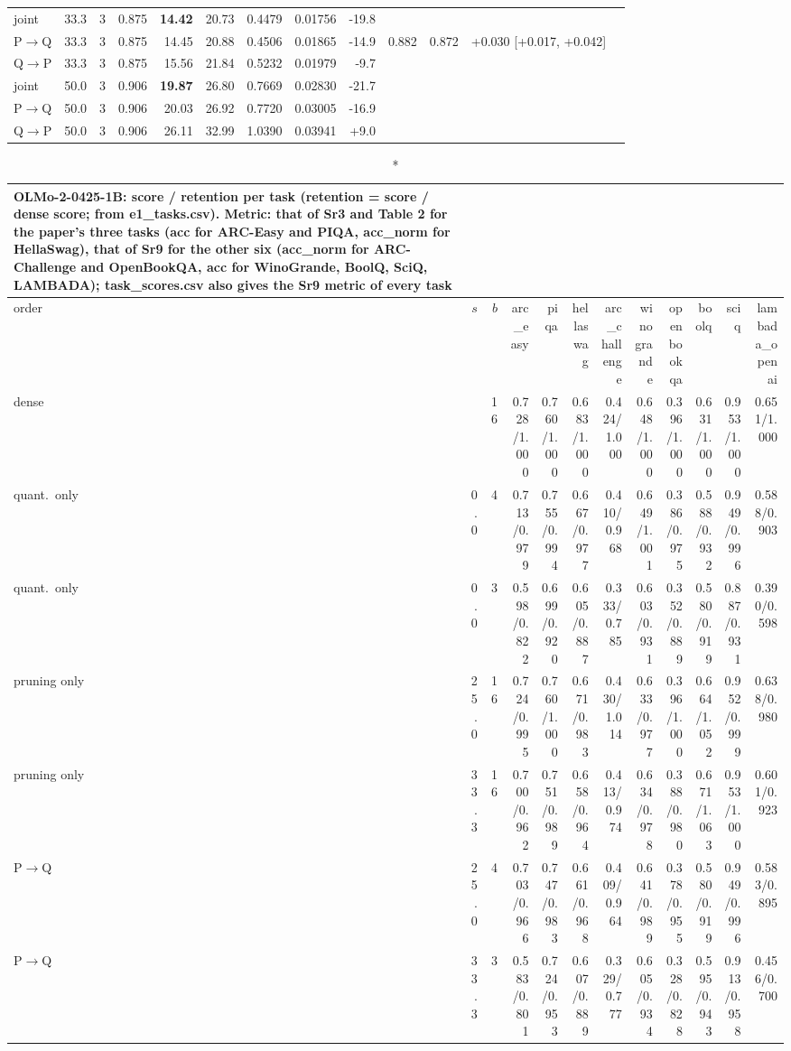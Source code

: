 \documentclass{article}
\begin{document}
\begin{longtable}{llrrrrrrrrrrl}
joint & 33.3 & 3 & 0.875 & \textbf{14.42} & 20.73 & 0.4479 & 0.01756 & -19.8 &  &  &  \\
P$\to$Q & 33.3 & 3 & 0.875 & 14.45 & 20.88 & 0.4506 & 0.01865 & -14.9 & 0.882 & 0.872 & +0.030 [+0.017, +0.042] \\
Q$\to$P & 33.3 & 3 & 0.875 & 15.56 & 21.84 & 0.5232 & 0.01979 & -9.7 &  &  &  \\
joint & 50.0 & 3 & 0.906 & \textbf{19.87} & 26.80 & 0.7669 & 0.02830 & -21.7 &  &  &  \\
P$\to$Q & 50.0 & 3 & 0.906 & 20.03 & 26.92 & 0.7720 & 0.03005 & -16.9 &  &  &  \\
Q$\to$P & 50.0 & 3 & 0.906 & 26.11 & 32.99 & 1.0390 & 0.03941 & +9.0 &  &  &  \\
\bottomrule\end{longtable}
\begin{longtable}{lrrrrrrrrrrr}
\caption*{OLMo-2-0425-1B: score / retention per task (retention = score / dense score; from e1\_tasks.csv). Metric: that of Sr3 and Table 2 for the paper's three tasks (acc for ARC-Easy and PIQA, acc\_norm for HellaSwag), that of Sr9 for the other six (acc\_norm for ARC-Challenge and OpenBookQA, acc for WinoGrande, BoolQ, SciQ, LAMBADA); task\_scores.csv also gives the Sr9 metric of every task}\\
\toprule order & $s$ & $b$ & arc\_easy & piqa & hellaswag & arc\_challenge & winogrande & openbookqa & boolq & sciq & lambada\_openai \\ \midrule \endhead
dense &  & 16 & 0.728/1.000 & 0.760/1.000 & 0.683/1.000 & 0.424/1.000 & 0.648/1.000 & 0.396/1.000 & 0.631/1.000 & 0.953/1.000 & 0.651/1.000 \\
quant.\ only & 0.0 & 4 & 0.713/0.979 & 0.755/0.994 & 0.667/0.977 & 0.410/0.968 & 0.649/1.001 & 0.386/0.975 & 0.588/0.932 & 0.949/0.996 & 0.588/0.903 \\
quant.\ only & 0.0 & 3 & 0.598/0.822 & 0.699/0.920 & 0.605/0.887 & 0.333/0.785 & 0.603/0.931 & 0.352/0.889 & 0.580/0.919 & 0.887/0.931 & 0.390/0.598 \\
pruning only & 25.0 & 16 & 0.724/0.995 & 0.760/1.000 & 0.671/0.983 & 0.430/1.014 & 0.633/0.977 & 0.396/1.000 & 0.664/1.052 & 0.952/0.999 & 0.638/0.980 \\
pruning only & 33.3 & 16 & 0.700/0.962 & 0.751/0.989 & 0.658/0.964 & 0.413/0.974 & 0.634/0.978 & 0.388/0.980 & 0.671/1.063 & 0.953/1.000 & 0.601/0.923 \\
P$\to$Q & 25.0 & 4 & 0.703/0.966 & 0.747/0.983 & 0.661/0.968 & 0.409/0.964 & 0.641/0.989 & 0.378/0.955 & 0.580/0.919 & 0.949/0.996 & 0.583/0.895 \\
P$\to$Q & 33.3 & 3 & 0.583/0.801 & 0.724/0.953 & 0.607/0.889 & 0.329/0.777 & 0.605/0.934 & 0.328/0.828 & 0.595/0.943 & 0.913/0.958 & 0.456/0.700 \\
\bottomrule\end{longtable}
\end{document}

